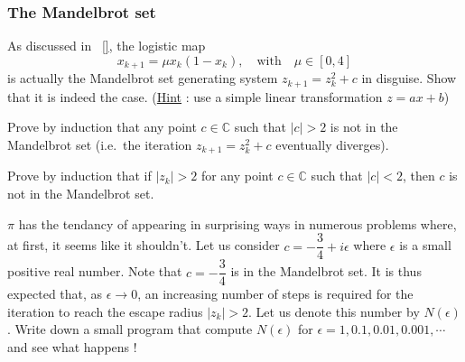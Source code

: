 \subsubsection*{The Mandelbrot set}

\begin{problem}
  As discussed in \textsection~\ref{}, the logistic map
  \[
  x_{k+1} = \mu x_k \left( 1 - x_k \right), \quad \text{with} \quad \mu \in \left[0, 4 \right]
  \]
  is actually the Mandelbrot set generating system $z_{k+1} = z_k^2 + c$ in disguise.
  Show that it is indeed the case. (\underline{Hint} : use a simple linear transformation $z = ax + b$)
\end{problem}

\bigskip

\begin{problem}[]
  Prove by induction that any point $c \in \mathbb{C}$ such that $\vert c \vert > 2$ is not in the Mandelbrot set (i.e.\ the iteration $z_{k+1} = z_k^2 + c$ eventually diverges).
\end{problem}

\bigskip

\begin{problem}
  Prove by induction that if $\vert z_k \vert > 2$ for any point $c \in \mathbb{C}$ such that $\vert c \vert < 2$, then $c$ is not in the Mandelbrot set.
\end{problem}

\bigskip

\begin{problem}
  $\pi$ has the tendancy of appearing in surprising ways in numerous problems where, at first, it seems like it shouldn't.
  Let us consider $c = -\dfrac{3}{4} + i \epsilon$ where $\epsilon$ is a small positive real number.
  Note that $c = -\dfrac{3}{4}$ is in the Mandelbrot set.
  It is thus expected that, as $\epsilon \to 0$, an increasing number of steps is required for the iteration to reach the escape radius $\vert z_k \vert > 2$.
  Let us denote this number by $N(\epsilon)$.
  Write down a small program that compute $N(\epsilon)$ for $\epsilon = 1, 0.1, 0.01, 0.001, \cdots$ and see what happens !

\end{problem}
